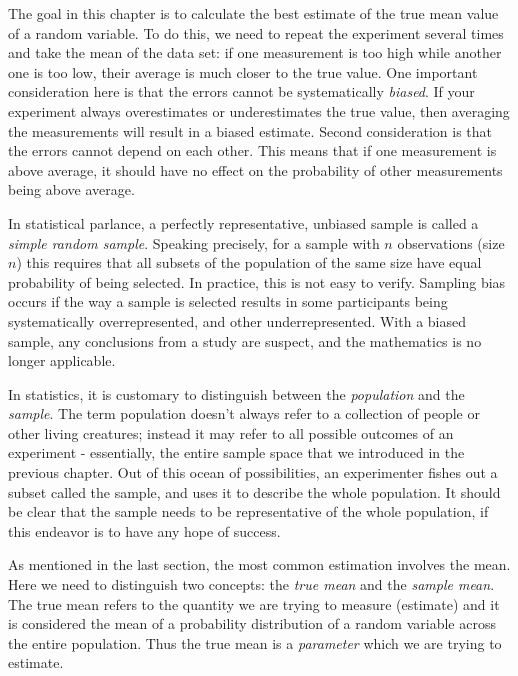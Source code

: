 \documentclass[
  letterpaper,
  DIV=11,
  numbers=noendperiod]{scrreprt}
\begin{document}
The goal in this chapter is to calculate the best estimate of the true
mean value of a random variable. To do this, we need to repeat the
experiment several times and take the mean of the data set: if one
measurement is too high while another one is too low, their average is
much closer to the true value. One important consideration here is that
the errors cannot be systematically \emph{biased}. If your experiment
always overestimates or underestimates the true value, then averaging
the measurements will result in a biased estimate. Second consideration
is that the errors cannot depend on each other. This means that if one
measurement is above average, it should have no effect on the
probability of other measurements being above average.

In statistical parlance, a perfectly representative, unbiased sample is
called a \emph{simple random sample}. Speaking precisely, for a sample
with \(n\) observations (size \(n\)) this requires that all subsets of
the population of the same size have equal probability of being
selected. In practice, this is not easy to verify. Sampling bias occurs
if the way a sample is selected results in some participants being
systematically overrepresented, and other underrepresented. With a
biased sample, any conclusions from a study are suspect, and the
mathematics is no longer applicable.

In statistics, it is customary to distinguish between the
\emph{population} and the \emph{sample}. The term population doesn't
always refer to a collection of people or other living creatures;
instead it may refer to all possible outcomes of an experiment -
essentially, the entire sample space that we introduced in the previous
chapter. Out of this ocean of possibilities, an experimenter fishes out
a subset called the sample, and uses it to describe the whole
population. It should be clear that the sample needs to be
representative of the whole population, if this endeavor is to have any
hope of success.

As mentioned in the last section, the most common estimation involves
the mean. Here we need to distinguish two concepts: the \emph{true mean}
and the \emph{sample mean}. The true mean refers to the quantity we are
trying to measure (estimate) and it is considered the mean of a
probability distribution of a random variable across the entire
population. Thus the true mean is a \emph{parameter} which we are trying
to estimate.
\end{document}
